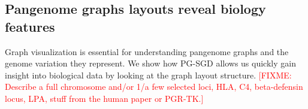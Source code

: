 \documentclass{bioinfo}
\theoremstyle{definition}
\newcommand{\red}[1]{{\textcolor{Red}{#1}}}
\newcommand{\FIXME}[1]{\red{[FIXME: #1]}}
\begin{document}
    \subsection{Pangenome graphs layouts reveal biology features}
	Graph visualization is essential for understanding pangenome graphs and the genome variation they represent.
	We show how PG-SGD allows us quickly gain insight into biological data by looking at the graph layout structure.
	\FIXME{Describe a full chromosome and/or 1/a few selected loci, HLA, C4, beta-defensin locus, LPA, stuff from the human paper or PGR-TK.}

\end{document}
